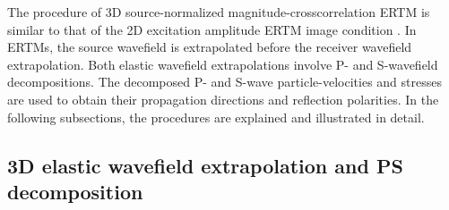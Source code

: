 \documentclass[manuscript,ulem,graphix,revised]{geophysics}
\begin{document}
The procedure of 3D source-normalized magnitude-crosscorrelation ERTM is similar to that of the 2D excitation amplitude ERTM image condition \citep{wenlong_vct15}. In ERTMs, the source wavefield is extrapolated before the receiver wavefield extrapolation. Both elastic wavefield extrapolations involve P- and S-wavefield decompositions. The decomposed P- and S-wave particle-velocities and stresses are used to obtain their propagation directions and reflection polarities. 
In the following subsections, the procedures are explained and illustrated in detail.

\subsection{3D elastic wavefield extrapolation and PS decomposition}
\end{document}
